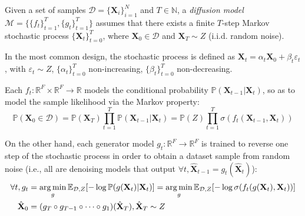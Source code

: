 \begin{definition}
    Given a set of samples $\mathcal{D}=\{\mathbf{X}_i\}_{i=1}^{N}$ and $T\in\mathbb{N}$, a \emph{diffusion model} \cite{sohl-dickstein_deep_2015} $\mathcal{M}=\{\{f_t\}_{t=1}^{T},\{g_t\}_{t=1}^{T}\}$ assumes that there exists a finite $T$-step Markov stochastic process $\{\mathbf{X}_t\}_{t=0}^{T}$, where $\mathbf{X}_0 \in \mathcal{D}$ and $\mathbf{X}_T \sim Z$ (i.i.d. random noise). 

    In the most common design, the stochastic process is defined as $\mathbf{X}_t=\alpha_t \mathbf{X}_{0} + \beta_t \varepsilon_t $, with $\varepsilon_t \sim Z$, $\{\alpha_t\}_{t=0}^{T}$ non-increasing, $\{\beta_t\}_{t=0}^{T}$ non-decreasing.
    
    Each $f_t: \mathbb{R}^F \times \mathbb{R}^F \to \mathbb{R}$ models the conditional probability $\mathbb{P}(\mathbf{X}_{t-1}|\mathbf{X}_t)$, so as to model the sample likelihood via the Markov property:
    \begin{equation}
    \mathbb{P}(\mathbf{X}_0 \in \mathcal{D})=\mathbb{P}(\mathbf{X}_T)\prod_{t=1}^{T}{\mathbb{P}(\mathbf{X}_{t-1}|\mathbf{X}_t)}=\mathbb{P}(Z)\prod_{t=1}^{T}{\sigma(f_t(\mathbf{X}_{t-1}, \mathbf{X}_t))}
    \end{equation}
    
    On the other hand, each generator model $g_t:\mathbb{R}^F \to \mathbb{R}^F$ is trained to reverse one step of the stochastic process in order to obtain a dataset sample from random noise (i.e., all are denoising models that output $\forall t, \hat{\mathbf{X}}_{t-1}=g_t(\hat{\mathbf{X}}_t)$):
    \begin{align}   
    \begin{split}
    \forall t, g_t &= \operatorname*{arg\,min}_{g}{\mathbb{E}_{\mathcal{D},Z}[-\log{\mathbb{P}(g(\mathbf{X}_t)|\mathbf{X}_t)}]}=\operatorname*{arg\,min}_{g}{\mathbb{E}_{\mathcal{D},Z}[-\log{\sigma(f_t(g(\mathbf{X}_t),\mathbf{X}_t))}]} \\
    \hat{\mathbf{X}}_0 &= (g_T \circ g_{T-1}\circ\dots\circ g_1)(\hat{\mathbf{X}}_T),\hat{\mathbf{X}}_T\sim Z
    \end{split}
    \end{align}
\end{definition}

